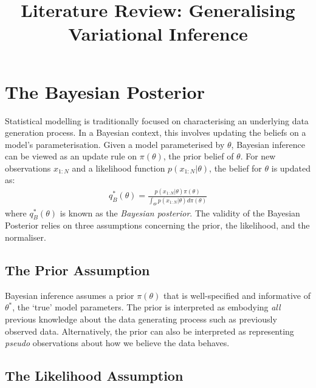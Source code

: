 \documentclass[twoside,11pt]{article}
\begin{document}
\title{Literature Review: Generalising Variational Inference}
\maketitle

\section{The Bayesian Posterior \cite{knoblauch2022optimization}}
Statistical modelling is traditionally focused on characterising an underlying data generation process. In a Bayesian context, this involves updating the beliefs on a model's parameterisation. Given a model parameterised by $\theta$, Bayesian inference can be viewed as an update rule on $\pi(\theta)$, the prior belief of $\theta$. For new observations $x_{1:N}$ and a likelihood function $p(x_{1:N}|\theta)$, the belief for $\theta$ is updated as:
\begin{align}
q_B^*(\theta) = \frac{p(x_{1:N}|\theta) \pi(\theta)}{\int_{\Theta} p(x_{1:N}|\theta) d \pi(\theta)}
\label{bayesian-posterior}
\end{align}
where $q_B^*(\theta)$ is known as the \textit{Bayesian posterior}. The validity of the Bayesian Posterior relies on three assumptions concerning the prior, the likelihood, and the normaliser. 

\subsection{The Prior Assumption} \label{sec:prior}
Bayesian inference assumes a prior $\pi(\theta)$ that is well-specified and informative of $\theta^*$, the `true' model parameters. The prior is interpreted as embodying \textit{all} previous knowledge about the data generating process such as previously observed data. Alternatively, the prior can also be interpreted as representing \textit{pseudo} observations about how we believe the data behaves.

\subsection{The Likelihood Assumption}\label{sec:likelihood}
\end{document}
